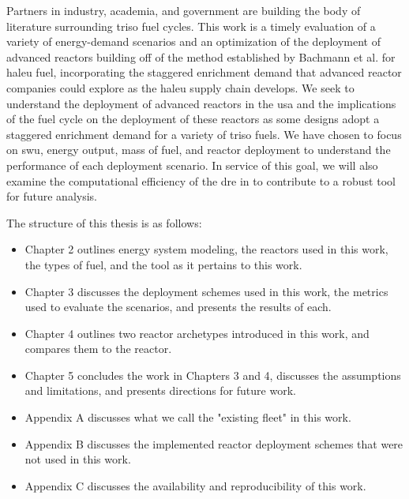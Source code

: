 Partners in industry, academia, and government are building the body of
literature surrounding \gls{triso} fuel cycles. This work is a timely
evaluation of a variety of energy-demand scenarios and an optimization of the
deployment of advanced reactors building off of the method established by
Bachmann et al. \cite{bachmann_enrichment_2021} for \gls{haleu} fuel,
incorporating the staggered enrichment demand that advanced reactor
companies could explore as the \gls{haleu} supply chain
develops. We seek to understand the deployment of advanced reactors in the
\gls{usa} and the implications of the fuel cycle on the deployment of these
reactors as some designs adopt a staggered enrichment demand for a variety of
\gls{triso} fuels. We have chosen to focus on \gls{swu},
energy output, mass of fuel, and reactor deployment to understand
the performance of each deployment scenario. In
service of this goal, we will also examine the computational efficiency of the
\gls{dre} in \cyclus to contribute to a robust tool for future analysis.


The structure of this thesis is as follows:

\begin{itemize}
    \item Chapter 2 outlines energy system modeling, the reactors used in this work, the types of fuel, and the \cyclus tool as it pertains to this work.
    \item Chapter 3 discusses the deployment schemes used in this work, the metrics used to evaluate the scenarios, and presents the results of each.
    \item Chapter 4 outlines two reactor archetypes introduced in this work, and compares them to the \cycamore reactor.
    \item Chapter 5 concludes the work in Chapters 3 and 4, discusses the assumptions and limitations, and presents directions for future work.
    \item Appendix A discusses what we call the "existing fleet" in this work.
    \item Appendix B discusses the implemented reactor deployment schemes that were not used in this work.
    \item Appendix C discusses the availability and reproducibility of this work.
\end{itemize}